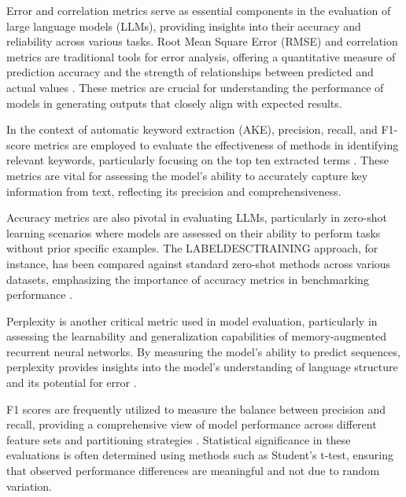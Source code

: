 Error and correlation metrics serve as essential components in the evaluation of large language models (LLMs), providing insights into their accuracy and reliability across various tasks. Root Mean Square Error (RMSE) and correlation metrics are traditional tools for error analysis, offering a quantitative measure of prediction accuracy and the strength of relationships between predicted and actual values \cite{yuan2018generatingmandarincantonesef0}. These metrics are crucial for understanding the performance of models in generating outputs that closely align with expected results.



In the context of automatic keyword extraction (AKE), precision, recall, and F1-score metrics are employed to evaluate the effectiveness of methods in identifying relevant keywords, particularly focusing on the top ten extracted terms \cite{altuncu2022improvingperformanceautomatickeyword}. These metrics are vital for assessing the model's ability to accurately capture key information from text, reflecting its precision and comprehensiveness.



Accuracy metrics are also pivotal in evaluating LLMs, particularly in zero-shot learning scenarios where models are assessed on their ability to perform tasks without prior specific examples. The LABELDESCTRAINING approach, for instance, has been compared against standard zero-shot methods across various datasets, emphasizing the importance of accuracy metrics in benchmarking performance \cite{gao2023benefitslabeldescriptiontrainingzeroshot}.



Perplexity is another critical metric used in model evaluation, particularly in assessing the learnability and generalization capabilities of memory-augmented recurrent neural networks. By measuring the model's ability to predict sequences, perplexity provides insights into the model's understanding of language structure and its potential for error \cite{das2024exploringlearnabilitymemoryaugmentedrecurrent}.



F1 scores are frequently utilized to measure the balance between precision and recall, providing a comprehensive view of model performance across different feature sets and partitioning strategies . Statistical significance in these evaluations is often determined using methods such as Student's t-test, ensuring that observed performance differences are meaningful and not due to random variation.



